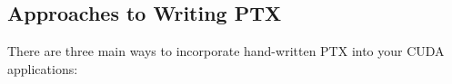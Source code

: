 \subsection{Approaches to Writing PTX}

There are three main ways to incorporate hand-written PTX into your CUDA applications:

